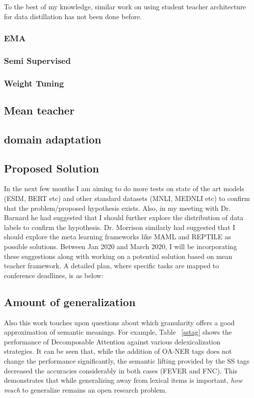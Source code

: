 \documentclass[compsoc,onecolumn]{IEEEtran}
\begin{document}
To the best of my knowledge, similar work on using student teacher architecture for data distillation has not been done before.

\subsubsection{EMA}
\subsubsection{Semi Supervised}
\subsubsection{Weight Tuning}





\subsection{Mean teacher}

\subsection{domain adaptation }

\subsection{Proposed Solution}


In the next few months I am aiming to do more tests on state of the art models (ESIM, BERT etc) and other standard datasets (MNLI, MEDNLI etc)  to confirm that the problem/proposed hypothesis exists. Also, in my meeting with Dr. Barnard he had suggested that I should further explore the distribution of data labels to confirm the hypothesis. Dr. Morrison similarly had suggested that I should explore the meta learning frameworks like MAML and REPTILE as possible solutions. Between Jan 2020 and March 2020, I will be incorporating these suggestions along with working on a potential solution based on mean teacher framework. A detailed plan, where specific tasks are mapped to conference deadlines, is as below:

\subsection{Amount of generalization}
Also this work touches upon questions about which granularity offers a good approximation of semantic meanings. For example, Table ~\ref{sstag} shows the performance of Decomposable Attention against various delexicalization strategies. It can be seen that, while the addition of OA-NER tags does not change the performance significantly, the semantic lifting provided by the SS tags decreased the accuracies considerably in both cases (FEVER and FNC).  This demonstrates that while generalizing away from lexical items is important, {\em how much} to generalize remains an open research problem.
\end{document}
